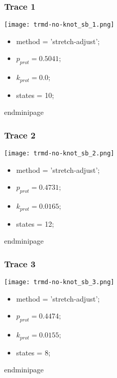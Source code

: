 \begin{minipage}[c]{0.45\textwidth}
\begin{minipage}[c]{0.45\textwidth}
\begin{minipage}[c]{0.45\textwidth}
\begin{minipage}[c]{0.45\textwidth}
\begin{minipage}[c]{0.45\textwidth}
\begin{minipage}[c]{0.45\textwidth}
\subsubsection{Trace 1}
\begin{minipage}[c]{0.7\textwidth}
    \texttt{[image: trmd-no-knot\_sb\_1.png]}
\end{minipage}
\hfill
\begin{minipage}[c]{0.45\textwidth}
    \begin{itemize}
        \item method = 'stretch-adjust';
        \item $p_{prot}=0.5041$;
        \item $k_{prot}=0.0$;
        \item states = 10;
    \end{itemize}
end{minipage}

\subsubsection{Trace 2}
\begin{minipage}[c]{0.7\textwidth}
    \texttt{[image: trmd-no-knot\_sb\_2.png]}
\end{minipage}
\hfill
\begin{minipage}[c]{0.45\textwidth}
    \begin{itemize}
        \item method = 'stretch-adjust';
        \item $p_{prot}=0.4731$;
        \item $k_{prot}=0.0165$;
        \item states = 12;
    \end{itemize}
end{minipage}

\subsubsection{Trace 3}
\begin{minipage}[c]{0.7\textwidth}
    \texttt{[image: trmd-no-knot\_sb\_3.png]}
\end{minipage}
\hfill
\begin{minipage}[c]{0.45\textwidth}
    \begin{itemize}
        \item method = 'stretch-adjust';
        \item $p_{prot}=0.4474$;
        \item $k_{prot}=0.0155$;
        \item states = 8;
    \end{itemize}
end{minipage}


\end{minipage}
\end{minipage}
\end{minipage}
\end{minipage}
\end{minipage}
\end{minipage}
\end{minipage}
\end{minipage}
\end{minipage}

